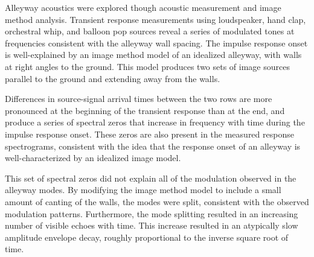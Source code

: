\documentclass{aes137}
\begin{document}
%
%
%


Alleyway acoustics were explored though acoustic measurement and image method analysis. Transient response measurements using loudspeaker, hand clap, orchestral whip, and balloon pop sources reveal a series of modulated tones at frequencies consistent with the alleyway wall spacing. The impulse response onset is well-explained by an image method model of an idealized alleyway, with walls at right angles to the ground. This model produces two sets of image sources parallel to the ground and extending away from the walls. 

Differences in source-signal arrival times between the two rows are more pronounced at the beginning of the transient response than at the end, and produce a series of spectral zeros that increase in frequency with time during the impulse response onset. These zeros are also present in the measured response spectrograms, consistent with the idea that the response onset of an alleyway is well-characterized by an idealized image model.

This set of spectral zeros did not explain all of the modulation observed in the alleyway modes. By modifying the image method model to include a small amount of canting of the walls, the modes were split, consistent with the observed modulation patterns. Furthermore, the mode splitting resulted in an increasing number of visible echoes with time. This increase resulted in an atypically slow amplitude envelope decay, roughly proportional to the inverse square root of time. 
\end{document}
